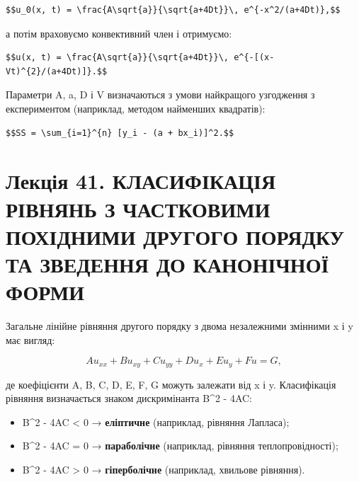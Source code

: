 \documentclass[
  ukrainian,
]{article}
\begin{document}
\begin{verbatim}
$$u_0(x, t) = \frac{A\sqrt{a}}{\sqrt{a+4Dt}}\, e^{-x^2/(a+4Dt)},$$
\end{verbatim}

а потім враховуємо конвективний член і отримуємо:

\begin{verbatim}
$$u(x, t) = \frac{A\sqrt{a}}{\sqrt{a+4Dt}}\, e^{-[(x-Vt)^{2}/(a+4Dt)]}.$$
\end{verbatim}

Параметри A, a, D і V визначаються з умови найкращого узгодження з
експериментом (наприклад, методом найменших квадратів):

\begin{verbatim}
$$SS = \sum_{i=1}^{n} [y_i - (a + bx_i)]^2.$$
\end{verbatim}

\section{Лекція 41. КЛАСИФІКАЦІЯ РІВНЯНЬ З ЧАСТКОВИМИ ПОХІДНИМИ ДРУГОГО
ПОРЯДКУ ТА ЗВЕДЕННЯ ДО КАНОНІЧНОЇ
ФОРМИ}\label{ux43bux435ux43aux446ux456ux44f-41.-ux43aux43bux430ux441ux438ux444ux456ux43aux430ux446ux456ux44f-ux440ux456ux432ux43dux44fux43dux44c-ux437-ux447ux430ux441ux442ux43aux43eux432ux438ux43cux438-ux43fux43eux445ux456ux434ux43dux438ux43cux438-ux434ux440ux443ux433ux43eux433ux43e-ux43fux43eux440ux44fux434ux43aux443-ux442ux430-ux437ux432ux435ux434ux435ux43dux43dux44f-ux434ux43e-ux43aux430ux43dux43eux43dux456ux447ux43dux43eux457-ux444ux43eux440ux43cux438}

Загальне лінійне рівняння другого порядку з двома незалежними змінними x
і y має вигляд:

\[A u_{xx} + B u_{xy} + C u_{yy} + D u_x + E u_y + F u = G,\]

де коефіцієнти A, B, C, D, E, F, G можуть залежати від x і y.
Класифікація рівняння визначається знаком дискримінанта B\^{}2 - 4AC:

\begin{itemize}
\item
  B\^{}2 - 4AC \textless{} 0 → \textbf{еліптичне} (наприклад, рівняння
  Лапласа);
\item
  B\^{}2 - 4AC = 0 → \textbf{параболічне} (наприклад, рівняння
  теплопровідності);
\item
  B\^{}2 - 4AC \textgreater{} 0 → \textbf{гіперболічне} (наприклад,
  хвильове рівняння).
\end{itemize}
\end{document}

